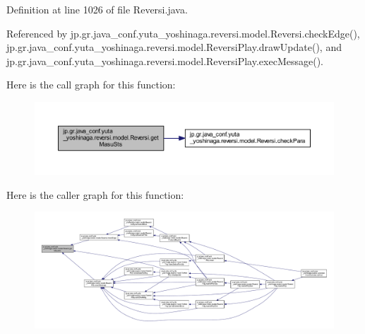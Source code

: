 Definition at line 1026 of file Reversi.\+java.



Referenced by jp.\+gr.\+java\+\_\+conf.\+yuta\+\_\+yoshinaga.\+reversi.\+model.\+Reversi.\+check\+Edge(), jp.\+gr.\+java\+\_\+conf.\+yuta\+\_\+yoshinaga.\+reversi.\+model.\+Reversi\+Play.\+draw\+Update(), and jp.\+gr.\+java\+\_\+conf.\+yuta\+\_\+yoshinaga.\+reversi.\+model.\+Reversi\+Play.\+exec\+Message().

Here is the call graph for this function\+:\nopagebreak
\begin{figure}[H]
\begin{center}
\leavevmode
\includegraphics[width=350pt]{classjp_1_1gr_1_1java__conf_1_1yuta__yoshinaga_1_1reversi_1_1model_1_1_reversi_aaab64f3b70ed5da5f0707933cbf82802_cgraph}
\end{center}
\end{figure}
Here is the caller graph for this function\+:\nopagebreak
\begin{figure}[H]
\begin{center}
\leavevmode
\includegraphics[width=350pt]{classjp_1_1gr_1_1java__conf_1_1yuta__yoshinaga_1_1reversi_1_1model_1_1_reversi_aaab64f3b70ed5da5f0707933cbf82802_icgraph}
\end{center}
\end{figure}
\mbox{\label{classjp_1_1gr_1_1java__conf_1_1yuta__yoshinaga_1_1reversi_1_1model_1_1_reversi_a1a528710342faba65975f4768d24b129}} 
